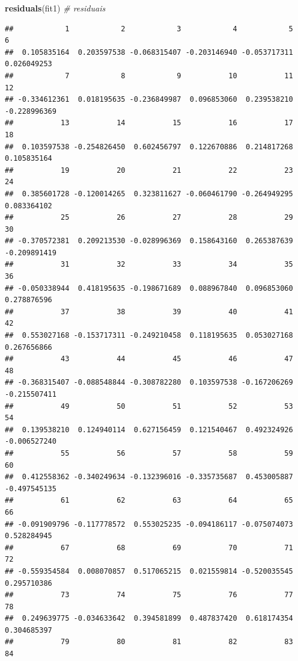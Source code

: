 \documentclass[
]{book}
\newenvironment{Shaded}{\begin{snugshade}}{\end{snugshade}}
\newcommand{\CommentTok}[1]{\textcolor[rgb]{0.56,0.35,0.01}{\textit{#1}}}
\newcommand{\KeywordTok}[1]{\textcolor[rgb]{0.13,0.29,0.53}{\textbf{#1}}}
\newcommand{\NormalTok}[1]{#1}
\begin{document}
\begin{Shaded}
\begin{Highlighting}[]
\KeywordTok{residuals}\NormalTok{(fit1) }\CommentTok{# residuais}
\end{Highlighting}
\end{Shaded}

\begin{verbatim}
##            1            2            3            4            5            6 
##  0.105835164  0.203597538 -0.068315407 -0.203146940 -0.053717311  0.026049253 
##            7            8            9           10           11           12 
## -0.334612361  0.018195635 -0.236849987  0.096853060  0.239538210 -0.228996369 
##           13           14           15           16           17           18 
##  0.103597538 -0.254826450  0.602456797  0.122670886  0.214817268  0.105835164 
##           19           20           21           22           23           24 
##  0.385601728 -0.120014265  0.323811627 -0.060461790 -0.264949295  0.083364102 
##           25           26           27           28           29           30 
## -0.370572381  0.209213530 -0.028996369  0.158643160  0.265387639 -0.209891419 
##           31           32           33           34           35           36 
## -0.050338944  0.418195635 -0.198671689  0.088967840  0.096853060  0.278876596 
##           37           38           39           40           41           42 
##  0.553027168 -0.153717311 -0.249210458  0.118195635  0.053027168  0.267656866 
##           43           44           45           46           47           48 
## -0.368315407 -0.088548844 -0.308782280  0.103597538 -0.167206269 -0.215507411 
##           49           50           51           52           53           54 
##  0.139538210  0.124940114  0.627156459  0.121540467  0.492324926 -0.006527240 
##           55           56           57           58           59           60 
##  0.412558362 -0.340249634 -0.132396016 -0.335735687  0.453005887 -0.497545135 
##           61           62           63           64           65           66 
## -0.091909796 -0.117778572  0.553025235 -0.094186117 -0.075074073  0.528284945 
##           67           68           69           70           71           72 
## -0.559354584  0.008070857  0.517065215  0.021559814 -0.520035545  0.295710386 
##           73           74           75           76           77           78 
##  0.249639775 -0.034633642  0.394581899  0.487837420  0.618174354  0.304685397 
##           79           80           81           82           83           84 

\end{verbatim}
\end{document}
